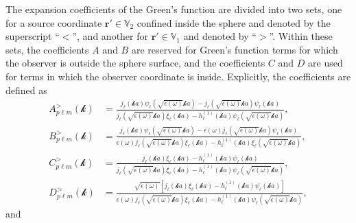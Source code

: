 \documentclass{article}
\begin{document}
The expansion coefficients of the Green's function are divided into two sets, one for a source coordinate $\mathbf{r}'\in\mathbb{V}_2$ confined inside the sphere and denoted by the superscript ``$<$'', and another for $\mathbf{r}'\in\mathbb{V}_1$ and denoted by ``$>$''. Within these sets, the coefficients $A$ and $B$ are reserved for Green's function terms for which the observer is outside the sphere surface, and the coefficients $C$ and $D$ are used for terms in which the observer coordinate is inside. Explicitly, the coefficients are defined as
\begin{equation}
\begin{split}
A_{p\ell m}^>(\mathcal{k}) &= \frac{j_\ell(\mathcal{k}a)\psi_\ell\left(\sqrt{\epsilon(\omega)}\mathcal{k}a\right) - j_\ell\left(\sqrt{\epsilon(\omega)}\mathcal{k}a\right)\psi_\ell(\mathcal{k}a)}{j_\ell\left(\sqrt{\epsilon(\omega)}\mathcal{k}a\right)\xi_\ell(\mathcal{k}a) - h_\ell^{(1)}(\mathcal{k}a)\psi_\ell\left(\sqrt{\epsilon(\omega)}\mathcal{k}a\right)},\\[1.0em]
B_{p\ell m}^>(\mathcal{k}) &= \frac{j_\ell(\mathcal{k}a)\psi_\ell\left(\sqrt{\epsilon(\omega)}\mathcal{k}a\right) - \epsilon(\omega) j_\ell\left(\sqrt{\epsilon(\omega)}\mathcal{k}a\right)\psi_\ell(\mathcal{k}a)}{\epsilon(\omega) j_\ell\left(\sqrt{\epsilon(\omega)}\mathcal{k}a\right)\xi_\ell(\mathcal{k}a) - h_\ell^{(1)}(\mathcal{k}a)\xi_\ell\left(\sqrt{\epsilon(\omega)}\mathcal{k}a\right)},\\[1.0em]
C_{p\ell m}^>(\mathcal{k}) &= \frac{j_\ell(\mathcal{k}a)\xi_\ell(\mathcal{k}a) - h_\ell^{(1)}(\mathcal{k}a)\psi_\ell(\mathcal{k}a)}{j_\ell\left(\sqrt{\epsilon(\omega)}\mathcal{k}a\right)\xi_\ell(\mathcal{k}a) - h_\ell^{(1)}(\mathcal{k}a)\psi_\ell\left(\sqrt{\epsilon(\omega)}\mathcal{k}a\right)},\\[1.0em]
D_{p\ell m}^>(\mathcal{k}) &= \frac{\sqrt{\epsilon(\omega)}\left[j_\ell(\mathcal{k}a)\xi_\ell(\mathcal{k}a) - h_\ell^{(1)}(\mathcal{k}a)\psi_\ell(\mathcal{k}a)\right]}{\epsilon(\omega) j_\ell\left(\sqrt{\epsilon(\omega)}\mathcal{k}a\right)\xi_\ell(\mathcal{k}a) - h_\ell^{(1)}(\mathcal{k}a)\psi_\ell\left(\sqrt{\epsilon(\omega)}\mathcal{k}a\right)},
\end{split}
\end{equation}
and
\end{document}
